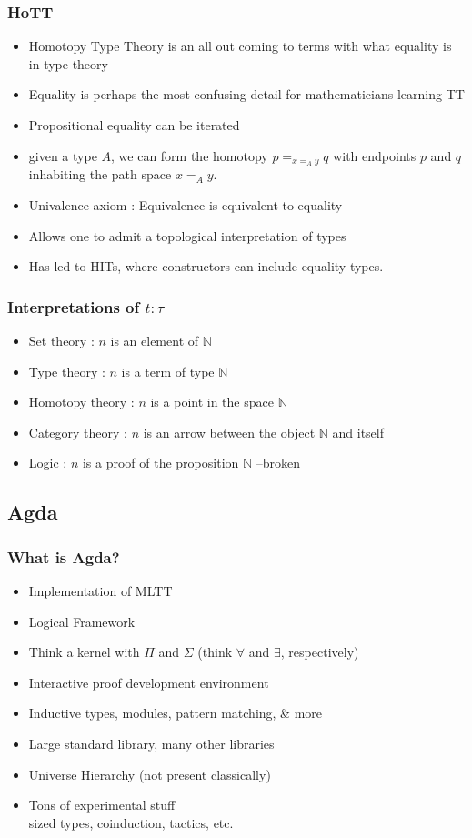 \documentclass[10pt]{beamer}
\begin{document}
\begin{frame}
\frametitle{HoTT}

\begin{itemize}
  \item Homotopy Type Theory is an all out coming to terms with what equality is
    in type theory
  \item Equality is perhaps the most confusing detail for mathematicians
    learning TT
  \item Propositional equality can be iterated
  \item given a type $A$, we can form the homotopy $p=_{x=_{A} y}q$
with endpoints $p$ and $q$ inhabiting the path space $x=_{A} y$.
  \item Univalence axiom : Equivalence is equivalent to equality
  \item Allows one to admit a topological interpretation of types
  \item Has led to HITs, where constructors can include
    equality types.  
\end{itemize}
\end{frame}

\begin{frame}
\frametitle{Interpretations of $t : \tau$}
\begin{itemize}
\item Set theory : $n$ is an element of $\mathbb{N}$
\item Type theory : $n$ is a term of type $\mathbb{N}$
\item Homotopy theory : $n$ is a point in the space $\mathbb{N}$
\item Category theory : $n$ is an arrow between the object $\mathbb{N}$ and itself
\item Logic : $n$ is a proof of the proposition $\mathbb{N}$ --broken
\end{itemize}
\end{frame}

\subsection{Agda}

\begin{frame}
\frametitle{What is Agda?}

\begin{itemize}
\item Implementation of MLTT
\item Logical Framework
\item Think a kernel with $\Pi$ and $\Sigma$ (think $\forall$ and $\exists$, respectively)
\item Interactive proof development environment
\item Inductive types, modules, pattern matching, \& more
\item Large standard library, many other libraries
\item Universe Hierarchy (not present classically)
\item Tons of experimental stuff\\
      sized types, coinduction, tactics, etc.
\end{itemize}
\end{frame}
\end{document}
